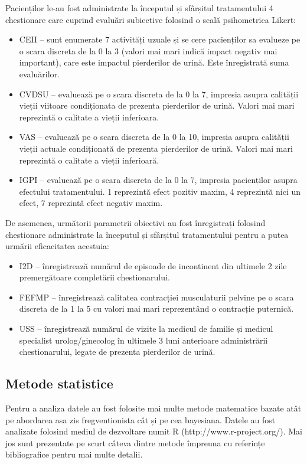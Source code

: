 \documentclass[12pt,draft]{article}
\begin{document}
  Pacienților le-au fost administrate la începutul și sfârșitul tratamentului 4 chestionare care cuprind evaluări subiective folosind o scală psihometrica Likert:
  \begin{itemize}
    \item \ac{CEII} -- sunt enumerate 7 activități uzuale și se cere pacienților sa evalueze pe o scara discreta de la 0 la 3 (valori mai mari indică impact negativ mai important), care este impactul pierderilor de urină. Este înregistrată suma evaluărilor.
    \item \ac{CVDSU} -- evaluează pe o scara discreta de la 0 la 7, impresia asupra calității vieții viitoare condiționata de prezenta pierderilor de urină. Valori mai mari reprezintă o calitate a vieții inferioara.
    \item \ac{VAS} -- evaluează pe o scara discreta de la 0 la 10, impresia asupra calității vieții actuale condiționată de prezenta pierderilor de urină. Valori mai mari reprezintă o calitate a vieții inferioară.
    \item \ac{IGPI} -- evaluează pe o scara discreta de la 0 la 7, impresia pacienților asupra efectului tratamentului. 1 reprezintă efect pozitiv maxim, 4 reprezintă nici un efect, 7 reprezintă efect negativ maxim.
  \end{itemize}
  De asemenea, următorii parametrii obiectivi au fost înregistrați folosind chestionare administrate la începutul și sfârșitul tratamentului pentru a putea urmării eficacitatea acestuia:
  \begin{itemize}
    \item I2D -- înregistrează numărul de episoade de incontinent din ultimele 2 zile premergătoare completării chestionarului. 
    \item \ac{FEFMP} -- înregistrează calitatea contracției musculaturii pelvine pe o scara discreta de la 1 la 5 cu valori mai mari reprezentând o contracție puternică. 
    \item \ac{USS} -- înregistrează numărul de vizite la medicul de familie și medicul specialist urolog/ginecolog în ultimele 3 luni anterioare administrării chestionarului, legate de prezenta pierderilor de urină.
  \end{itemize}

\subsection{Metode statistice}
  Pentru a analiza datele au fost folosite mai multe metode matematice bazate atât pe abordarea asa zis fregventionista cât și pe cea bayesiana. Datele au fost analizate folosind mediul de dezvoltare numit R (http://www.r-project.org/). Mai jos sunt prezentate pe scurt câteva dintre metode împreuna cu referințe bibliografice pentru mai multe detalii.
\end{document}
